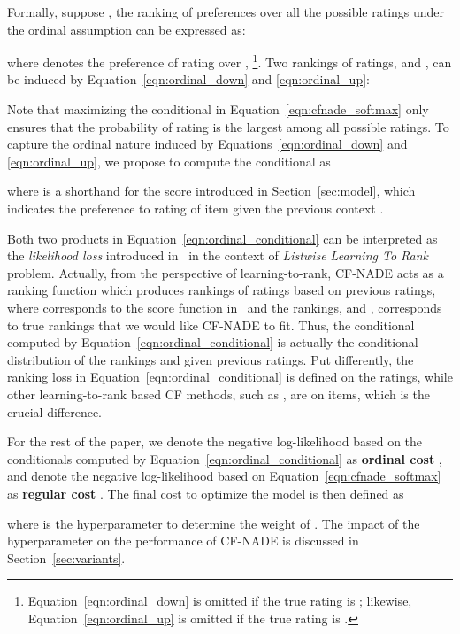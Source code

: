 \documentclass{article}
\newcommand{\cfnade}{CF-NADE\xspace}
\begin{document}
Formally, suppose , the ranking of preferences over all
the possible ratings under the ordinal assumption can be expressed as:

where  denotes the preference of rating  over ,
\footnote{Equation~\ref{eqn:ordinal_down} is
  omitted if the true rating is ; likewise,
  Equation~\ref{eqn:ordinal_up} is omitted if the true rating is .}.
Two rankings of ratings,  and
, can be induced by
Equation~\ref{eqn:ordinal_down} and \ref{eqn:ordinal_up}:


Note that maximizing the conditional  in Equation~\ref{eqn:cfnade_softmax} only ensures that the probability of rating  is the largest among all possible ratings. To capture the ordinal nature induced by Equations~\ref{eqn:ordinal_down} and \ref{eqn:ordinal_up}, we propose to compute the conditional  as

where  is a shorthand for the score  introduced in Section~\ref{sec:model}, which indicates the preference to rating  of item  given the previous context . 

Both two products in Equation~\ref{eqn:ordinal_conditional} can be
interpreted as the \emph{likelihood loss} introduced
in~\citep{xia2008listwise} in the context of \emph{Listwise Learning
  To Rank} problem. Actually, from the perspective of
learning-to-rank, \cfnade acts as a ranking function which produces
rankings of ratings based on previous ratings, where
 corresponds to the score
function in~\citep{xia2008listwise} and the rankings,
 and , corresponds to
true rankings that we would like \cfnade to fit. Thus, the conditional
computed by Equation~\ref{eqn:ordinal_conditional} is actually the
conditional distribution of the rankings  and
 given previous  ratings. Put differently, the ranking loss in Equation~\ref{eqn:ordinal_conditional}
is defined on the ratings, while other learning-to-rank based CF methods, such as \citep{shi2010list}, are on items, which is the crucial difference.

For the rest of the paper, we denote the negative log-likelihood based
on the conditionals computed by Equation~\ref{eqn:ordinal_conditional}
as \textbf{ordinal cost} , and denote the
negative log-likelihood based on Equation~\ref{eqn:cfnade_softmax} as
\textbf{regular cost} . The final cost to
optimize the model is then defined as

where  is the hyperparameter to determine the weight of
. The impact of the hyperparameter  on
the performance of \cfnade is discussed in Section~\ref{sec:variants}.
\end{document}
